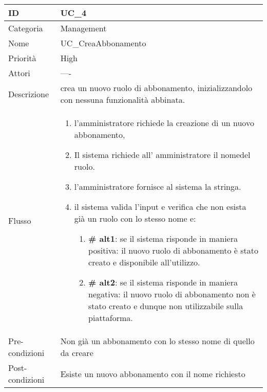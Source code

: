 \begin{center}
\begin{tabular}{ |p{2cm}|p{13cm}|  }
\hline
ID & UC\_4 \\\hline
Categoria & Management\\\hline
Nome & UC\_CreaAbbonamento\\\hline
Priorità & High \\\hline
Attori &  ---- \\\hline
Descrizione & crea un nuovo ruolo di abbonamento, inizializzandolo con nessuna funzionalità abbinata.\\\hline
Flusso &  	\begin{enumerate}
			\item l'amministratore richiede la creazione di un nuovo abbonamento,
			\item Il sistema richiede all' amministratore il nomedel ruolo.
			\item l'amministratore fornisce al sistema la stringa.
			\item il sistema valida l'input e verifica che non esista già un ruolo con lo stesso nome e:
				\begin{enumerate}[  ]
					\item \textbf{\# alt1}: se il sistema risponde in maniera positiva: il nuovo ruolo di abbonamento è stato creato e disponibile all'utilizzo.
					\item \textbf{\# alt2}: se il sistema risponde in maniera negativa: il nuovo ruolo di abbonamento non è stato creato e dunque non utilizzabile sulla piattaforma.
				\end{enumerate}
			
		\end{enumerate}\\\hline
Pre-condizioni &  Non già un abbonamento con lo stesso nome di quello da creare\\\hline
Post-condizioni &  Esiste un nuovo abbonamento con il nome richiesto\\\hline
\end{tabular}
\label{table_use_case:4}\newline


\end{center}
